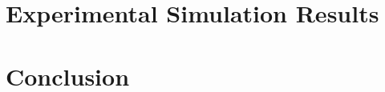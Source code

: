 \documentclass[letterpaper, 10 pt, journal, twoside]{IEEEtran}
\begin{document}
	
	

\section{Experimental Simulation Results}
\label{sec:results}

	


\section{Conclusion}

	


% 



\end{document}
